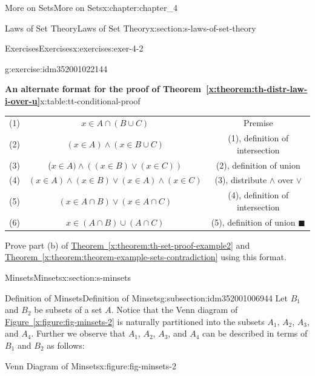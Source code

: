 \documentclass[oneside,10pt,]{book}
\newcommand{\tabularfont}{\relax}
\newcommand{\xreffont}{\relax}
\begin{document}
\begin{chapterptx}{More on Sets}{}{More on Sets}{}{}{x:chapter:chapter_4}
\begin{sectionptx}{Laws of Set Theory}{}{Laws of Set Theory}{}{}{x:section:s-laws-of-set-theory}
\begin{exercises-subsection}{Exercises}{}{Exercises}{}{}{x:exercises:exer-4-2}
\begin{divisionexercise}{6}{}{}{g:exercise:idm352001022144}
\begin{tableptx}{\textbf{An alternate format for the proof of Theorem~{\xreffont\ref*{x:theorem:th-distr-law-i-over-u}}}}{x:table:tt-conditional-proof}{}%
\centering
{\tabularfont%
\begin{tabular}{ccc}
(1)&\(x \in  A \cap  (B \cup  C)\)&Premise\tabularnewline[0pt]
(2)&\((x \in  A) \land  (x \in  B \cup  C)\)&(1), definition of intersection\tabularnewline[0pt]
(3)&(\(x \in  A) \land ((x \in  B) \lor  (x \in  C))\)&(2), definition of union\tabularnewline[0pt]
(4)&\((x \in A)\land (x\in  B)\lor  (x \in A)\land (x\in  C)\)&(3), distribute \(\land\) over \(\lor\)\tabularnewline[0pt]
(5)&\((x \in  A\cap B) \lor (x \in  A \cap C)\)&(4), definition of intersection\tabularnewline[0pt]
(6)&\(x \in  (A \cap B) \cup  (A \cap C)\)&(5), definition of union \(\blacksquare\)
\end{tabular}
}%
\end{tableptx}%
Prove part (b) of \hyperref[x:theorem:th-set-proof-example2]{Theorem~{\xreffont\ref{x:theorem:th-set-proof-example2}}} and \hyperref[x:theorem:theorem-example-sets-contradiction]{Theorem~{\xreffont\ref{x:theorem:theorem-example-sets-contradiction}}} using this format.%
\end{divisionexercise}%
\end{exercises-subsection}
\end{sectionptx}
%
%
\typeout{************************************************}
\typeout{************************************************}
%
\begin{sectionptx}{Minsets}{}{Minsets}{}{}{x:section:s-minsets}
%
%
\typeout{************************************************}
\typeout{************************************************}
%
\begin{subsectionptx}{Definition of Minsets}{}{Definition of Minsets}{}{}{g:subsection:idm352001006944}
Let \(B_1\) and \(B_2\) be subsets of a set \(A\). Notice that the Venn diagram of \hyperref[x:figure:fig-minsets-2]{Figure~{\xreffont\ref{x:figure:fig-minsets-2}}} is naturally partitioned into the subsets \(A_1\), \(A_2\), \(A_3\), and \(A_4\). Further we observe that \(A_1\), \(A_2\), \(A_3\), and \(A_4\) can be described in terms of \(B_1\) and \(B_2\) as follows:%
\begin{figureptx}{Venn Diagram of Minsets}{x:figure:fig-minsets-2}{}%
\begin{image}{0.165}{0.67}{0.165}%
%

\end{image}
\end{figureptx}
\end{subsectionptx}
\end{sectionptx}
\end{chapterptx}
\end{document}
